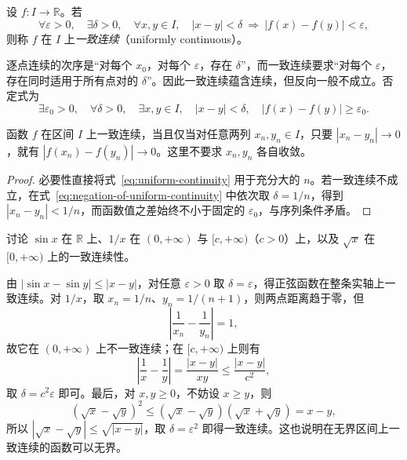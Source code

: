 \documentclass[UTF8,12pt,a4paper,fontset=fandol]{ctexbook}
\begin{document}
\begin{definition}
\label{def:uniform-continuity}
设 $f:I\to\mathbb{R}$。若
\begin{equation}
    \forall\varepsilon>0,\quad\exists\delta>0,\quad
    \forall x,y\in I,\quad
    |x-y|<\delta\ \Longrightarrow\ |f(x)-f(y)|<\varepsilon,
    \label{eq:uniform-continuity}
\end{equation}
则称 $f$ 在 $I$ 上\emph{一致连续}（uniformly continuous）。
\end{definition}

逐点连续的次序是“对每个 $x_0$，对每个 $\varepsilon$，存在 $\delta$”，而一致连续要求“对每个 $\varepsilon$，存在同时适用于所有点对的 $\delta$”。因此一致连续蕴含连续，但反向一般不成立。否定式为
\begin{equation}
    \exists\varepsilon_0>0,\quad\forall\delta>0,\quad
    \exists x,y\in I,\quad |x-y|<\delta,
    \quad |f(x)-f(y)|\geq\varepsilon_0.
    \label{eq:negation-of-uniform-continuity}
\end{equation}

\begin{theorem}[一致连续的序列判据]
\label{thm:sequential-criterion-uniform-continuity}
函数 $f$ 在区间 $I$ 上一致连续，当且仅当对任意两列 $x_n,y_n\in I$，只要 $|x_n-y_n|\to0$，就有 $|f(x_n)-f(y_n)|\to0$。这里不要求 $x_n,y_n$ 各自收敛。
\end{theorem}

\begin{proof}
必要性直接将式~\eqref{eq:uniform-continuity} 用于充分大的 $n$。若一致连续不成立，在式~\eqref{eq:negation-of-uniform-continuity} 中依次取 $\delta=1/n$，得到 $|x_n-y_n|<1/n$，而函数值之差始终不小于固定的 $\varepsilon_0$，与序列条件矛盾。
\end{proof}

\begin{example}
\label{ex:uniform-continuity-examples}
讨论 $\sin x$ 在 $\mathbb{R}$ 上、$1/x$ 在 $(0,+\infty)$ 与 $[c,+\infty)$（$c>0$）上，以及 $\sqrt{x}$ 在 $[0,+\infty)$ 上的一致连续性。
\end{example}

\begin{solve}
由 $|\sin x-\sin y|\leq|x-y|$，对任意 $\varepsilon>0$ 取 $\delta=\varepsilon$，得正弦函数在整条实轴上一致连续。对 $1/x$，取 $x_n=1/n$、$y_n=1/(n+1)$，则两点距离趋于零，但
\[
    \left|\frac1{x_n}-\frac1{y_n}\right|=1,
\]
故它在 $(0,+\infty)$ 上不一致连续；在 $[c,+\infty)$ 上则有
\[
    \left|\frac1x-\frac1y\right|=\frac{|x-y|}{xy}\leq\frac{|x-y|}{c^2},
\]
取 $\delta=c^2\varepsilon$ 即可。最后，对 $x,y\geq0$，不妨设 $x\geq y$，则
\[
    (\sqrt{x}-\sqrt{y})^2\leq(\sqrt{x}-\sqrt{y})(\sqrt{x}+\sqrt{y})=x-y,
\]
所以 $|\sqrt{x}-\sqrt{y}|\leq\sqrt{|x-y|}$，取 $\delta=\varepsilon^2$ 即得一致连续。这也说明在无界区间上一致连续的函数可以无界。
\end{solve}
\end{document}
